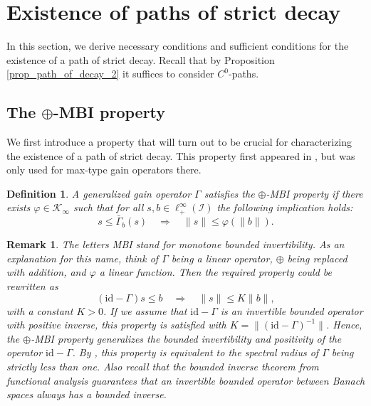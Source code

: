\documentclass[10pt, oneside, a4paper]{article}
\newcommand{\id}{\mathrm{id}}
\newcommand{\IC}{\mathcal{I}}
\newcommand{\KC}{\mathcal{K}}
\newcommand{\bsign}[1]{\bar{#1}}
\newtheorem{definition}{Definition}[section]
\newtheorem{remark}{Remark}[section]
\begin{document}
\section{Existence of paths of strict decay}\label{sec_path_of_decay}

In this section, we derive necessary conditions and sufficient conditions for the existence of a path of strict decay. Recall that by Proposition \ref{prop_path_of_decay_2} it suffices to consider $C^0$-paths.

\subsection{The \texorpdfstring{\(\oplus\)}{max}-MBI property}\label{subsec_max_mbi}

We first introduce a property that will turn out to be crucial for characterizing the existence of a path of strict decay. This property first appeared in \cite{Ruf}, but was only used for max-type gain operators there.

\begin{definition}
A generalized gain operator $\Gamma$ satisfies the \emph{$\oplus$-MBI property} if there exists $\varphi \in \KC_{\infty}$ such that for all $s,b \in \ell^{\infty}_+(\IC)$ the following implication holds:%
\begin{equation*}
  s \leq \bsign{\Gamma}_b(s) \quad \Rightarrow \quad \|s\| \leq \varphi(\|b\|).%
\end{equation*}
\end{definition}

\begin{remark}
The letters \emph{MBI} stand for \emph{monotone bounded invertibility}. As an explanation for this name, think of $\Gamma$ being a linear operator, $\oplus$ being replaced with addition, and $\varphi$ a linear function. Then the required property could be rewritten as%
\begin{equation*}
  (\id - \Gamma)s \leq b \quad \Rightarrow \quad \|s\| \leq K\|b\|,%
\end{equation*}
with a constant $K > 0$. If we assume that $\id - \Gamma$ is an invertible bounded operator with positive inverse, this property is satisfied with $K = \|(\id - \Gamma)^{-1}\|$. Hence, the $\oplus$-MBI property generalizes the bounded invertibility and positivity of the operator $\id - \Gamma$. By \cite[Thm.~3.3]{GMi}, this property is equivalent to the spectral radius of $\Gamma$ being strictly less than one. Also recall that the \emph{bounded inverse theorem} from functional analysis guarantees that an invertible bounded operator between Banach spaces always has a bounded inverse.
\end{remark}
\end{document}
